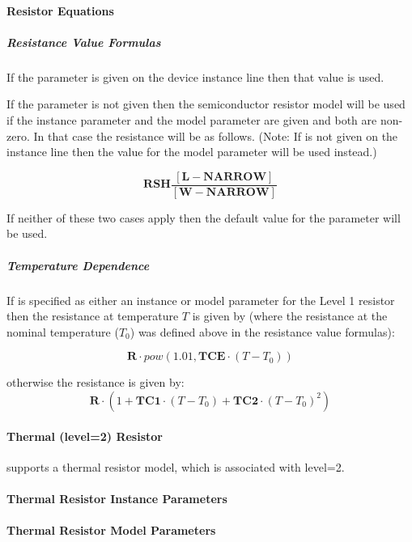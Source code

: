 \paragraph{Resistor Equations}

\subparagraph{Resistance Value Formulas}
If the  parameter is given on the device instance line 
then that value is used.

If the  parameter is not given then the semiconductor resistor model
will be used if the  instance parameter and the  model parameter
are given and both are non-zero.  In that case the resistance will be as follows.
(Note: If  is not given on the instance line then the value
for the model parameter  will be used instead.)

\[
\mathbf{RSH} \frac{[\mathbf{L} - \mathbf{NARROW}]}
{[\mathbf{W} - \mathbf{NARROW}]}
\]

If neither of these two cases apply then the default value for
the  parameter will be used.     

\subparagraph{Temperature Dependence}
If  is specified as either an instance or model parameter
for the Level 1 resistor then the resistance at temperature $T$
is given by (where the resistance at the nominal temperature ($T_{0}$) 
was defined above in the resistance value formulas):

\[
\mathbf{R} \cdot pow(1.01,\mathbf{TCE} \cdot (T - T_{0}))
\]

otherwise the resistance is given by:
\[
\mathbf{R} \cdot (1 + \mathbf{TC1} \cdot (T - T_{0}) + \mathbf{TC2}
\cdot (T - T_0)^2)
\]

\paragraph{Thermal (level=2) Resistor}

\Xyce{} supports a thermal resistor model, which is associated with level=2.

\paragraph{Thermal Resistor Instance Parameters}



\paragraph{Thermal Resistor Model Parameters}


